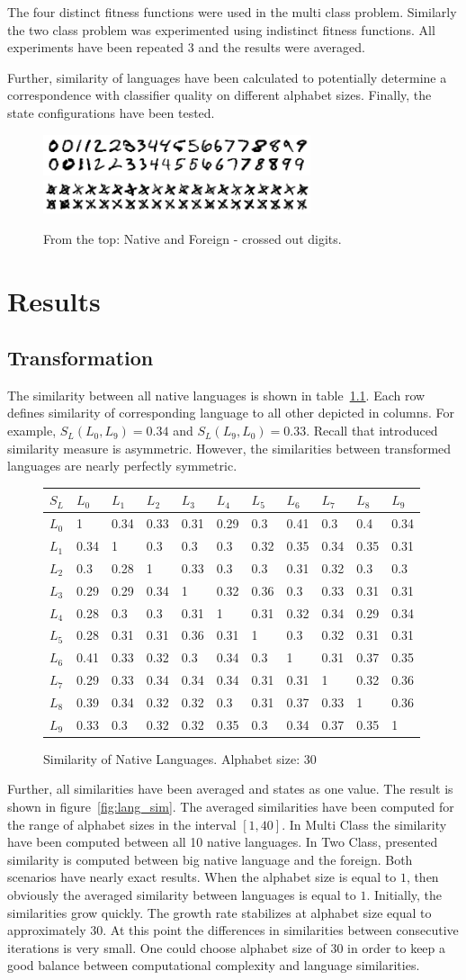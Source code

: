 \documentclass{mini}
\newcommand{\lanSim}[2]{
    S_{L}(#1,#2)
}
\newcommand{\makeTableMutualSimilarites}{
    \begin{figure}[H]
        \CenterFloatBoxes
        \begin{floatrow}
            
            \ttabbox
            {
                \centering
                \setlength{\tabcolsep}{10pt}
                \renewcommand{\arraystretch}{1.5}
                \begin{tabular}{|P{1.0cm} || P{0.6cm} | P{0.6cm} | P{0.6cm} | P{0.6cm} | P{0.6cm} | P{0.6cm} |P{0.6cm} | P{0.6cm} |P{0.6cm} | P{0.6cm}|}
                    \hline
                    $S_{L}$ & $L_{0}$ & $L_{1}$ & $L_{2}$ & $L_{3}$ & $L_{4}$ & $L_{5}$ & $L_{6}$ & $L_{7}$ & $L_{8}$ & $L_{9}$ \\
                    \hline
                    \hline
                    $L_{0}$ &1&0.34&0.33&0.31&0.29&0.3&0.41&0.3&0.4&0.34\\ 
                    \hline 
                    $L_{1}$ &0.34&1&0.3&0.3&0.3&0.32&0.35&0.34&0.35&0.31\\ 
                    \hline 
                    $L_{2}$ &0.3&0.28&1&0.33&0.3&0.3&0.31&0.32&0.3&0.3\\ 
                    \hline 
                    $L_{3}$ &0.29&0.29&0.34&1&0.32&0.36&0.3&0.33&0.31&0.31\\ 
                    \hline 
                    $L_{4}$ &0.28&0.3&0.3&0.31&1&0.31&0.32&0.34&0.29&0.34\\ 
                    \hline 
                    $L_{5}$ &0.28&0.31&0.31&0.36&0.31&1&0.3&0.32&0.31&0.31\\ 
                    \hline 
                    $L_{6}$ &0.41&0.33&0.32&0.3&0.34&0.3&1&0.31&0.37&0.35\\ 
                    \hline 
                    $L_{7}$ &0.29&0.33&0.34&0.34&0.34&0.31&0.31&1&0.32&0.36\\ 
                    \hline 
                    $L_{8}$ &0.39&0.34&0.32&0.32&0.3&0.31&0.37&0.33&1&0.36\\ 
                    \hline 
                    $L_{9}$ &0.33&0.3&0.32&0.32&0.35&0.3&0.34&0.37&0.35&1\\ 
                    \hline 
                \end{tabular}
            }
            {\caption{Similarity of Native Languages. Alphabet size: 30}
                \label{fig:tab_similarity}}
            
        \end{floatrow}
    \end{figure}
}
\begin{document}
The four distinct fitness functions were used in the multi class problem. Similarly the two class problem was experimented using indistinct fitness functions. All experiments have been repeated $3$ and the results were averaged.

Further, similarity of languages have been calculated to potentially determine a correspondence with classifier quality on different alphabet sizes. Finally, the state configurations have been tested.

\begin{figure}
    \includegraphics[width=0.7\textwidth]{./images/native.png}
    \includegraphics[width=0.7\textwidth]{./images/crossedout.png}
    \caption{From the top: Native and Foreign - crossed out digits.}
    \label{fig:native_foreign_png}
\end{figure}


\chapter{Results}\label{chap:results}


\section{Transformation}

The similarity between all native languages is shown in table~\ref{fig:tab_similarity}. Each row defines similarity of corresponding language to all other depicted in columns. For example, $\lanSim{L_0}{L_9} = 0.34$ and $\lanSim{L_9}{L_0} = 0.33$. Recall that introduced similarity measure is asymmetric. However, the similarities between transformed languages are nearly perfectly symmetric.

\makeTableMutualSimilarites

Further, all similarities have been averaged and states as one value. The result is shown in figure~\ref{fig:lang_sim}. The averaged similarities have been computed for the range of alphabet sizes in the interval $[1, 40]$. In Multi Class the similarity have been computed between all 10 native languages. In Two Class, presented similarity is computed between big native language and the foreign. Both scenarios have nearly exact results. When the alphabet size is equal to $1$, then obviously the averaged similarity between languages is equal to $1$. Initially, the similarities grow quickly. The growth rate stabilizes at alphabet size equal to approximately $30$. At this point the differences in similarities between consecutive iterations is very small. One could choose alphabet size of $30$ in order to keep a good balance between computational complexity and language similarities.
\end{document}
